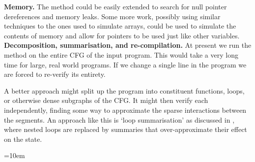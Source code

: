 \documentclass[12pt,a4paper]{article}
\begin{document}
\textbf{Memory.} The method could be easily extended to search for null pointer dereferences and memory leaks. Some more work, possibly using similar techniques to the ones used to simulate arrays, could be used to simulate the contents of memory and allow for pointers to be used just like other variables.\\

\textbf{Decomposition, summarisation, and re-compilation.} At present we run the method on the entire CFG of the input program. This would take a very long time for
large, real world programs. If we change a single line in the program we are forced to re-verify its entirety.
 
 A better approach might split up the program into constituent functions, loops, or otherwise dense subgraphs of the CFG. It might then verify each independently, finding some way to approximate
 the sparse interactions between the segments. An approach like this is `loop summarisation' as discussed in \citep{summary}, where nested loops are replaced by summaries that over-approximate their effect on the state. 
 
 \emergencystretch=10em

\end{document}
